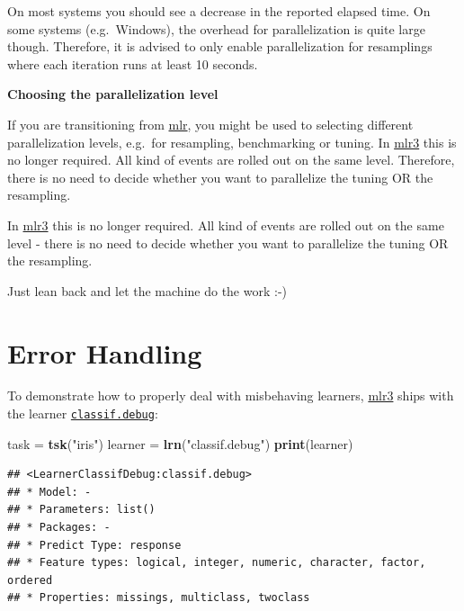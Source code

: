 \documentclass[]{scrbook}
\newenvironment{Shaded}{\begin{snugshade}}{\end{snugshade}}
\newcommand{\KeywordTok}[1]{\textcolor[rgb]{0.13,0.29,0.53}{\textbf{#1}}}
\newcommand{\NormalTok}[1]{#1}
\newcommand{\StringTok}[1]{\textcolor[rgb]{0.31,0.60,0.02}{#1}}
\renewenvironment{Shaded} {\begin{snugshade}\small} {\end{snugshade}}
\begin{document}
On most systems you should see a decrease in the reported elapsed time.
On some systems (e.g.~Windows), the overhead for parallelization is quite large though.
Therefore, it is advised to only enable parallelization for resamplings where each iteration runs at least 10 seconds.

\textbf{Choosing the parallelization level}

If you are transitioning from \href{https://cran.r-project.org/package=mlr}{mlr}, you might be used to selecting different parallelization levels, e.g.~for resampling, benchmarking or tuning.
In \href{https://mlr3.mlr-org.com}{mlr3} this is no longer required.
All kind of events are rolled out on the same level.
Therefore, there is no need to decide whether you want to parallelize the tuning OR the resampling.

In \href{https://mlr3.mlr-org.com}{mlr3} this is no longer required.
All kind of events are rolled out on the same level - there is no need to decide whether you want to parallelize the tuning OR the resampling.

Just lean back and let the machine do the work :-)

\hypertarget{error-handling}{%
\section{Error Handling}\label{error-handling}}

To demonstrate how to properly deal with misbehaving learners, \href{https://mlr3.mlr-org.com}{mlr3} ships with the learner \href{https://mlr3.mlr-org.com/reference/mlr_learners_classif.debug.html}{\texttt{classif.debug}}:

\begin{Shaded}
\begin{Highlighting}[]
\NormalTok{task =}\StringTok{ }\KeywordTok{tsk}\NormalTok{(}\StringTok{"iris"}\NormalTok{)}
\NormalTok{learner =}\StringTok{ }\KeywordTok{lrn}\NormalTok{(}\StringTok{"classif.debug"}\NormalTok{)}
\KeywordTok{print}\NormalTok{(learner)}
\end{Highlighting}
\end{Shaded}

\begin{verbatim}
## <LearnerClassifDebug:classif.debug>
## * Model: -
## * Parameters: list()
## * Packages: -
## * Predict Type: response
## * Feature types: logical, integer, numeric, character, factor, ordered
## * Properties: missings, multiclass, twoclass
\end{verbatim}
\end{document}
